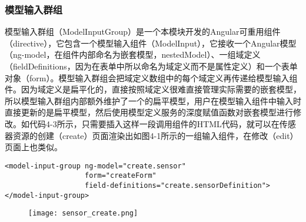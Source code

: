 \subsubsection{模型输入群组}
模型输入群组（ModelInputGroup）是一个本模块开发的Angular可重用组件（directive），它包含一个模型输入组件（ModelInput），它接收一个Angular模型（ng-model，在组件内部命名为嵌套模型，nestedModel）、一组域定义（fieldDefinitions，因为在表单中所以命名为域定义而不是属性定义）和一个表单对象（form）。模型输入群组会把域定义数组中的每个域定义再传递给模型输入组件。因为域定义是扁平化的，直接按照域定义很难直接管理实际需要的嵌套模型，所以模型输入群组内部额外维护了一个的扁平模型，用户在模型输入组件中输入时直接更新的是扁平模型，然后使用模型定义服务的深度赋值函数对嵌套模型进行修改。如代码4-3所示，只需要插入这样一段调用组件的HTML代码，就可以在传感器资源的创建（create）页面渲染出如图4-1所示的一组输入组件，在修改（edit）页面上也类似。
\begin{lstlisting}[language={HTML5}, caption={传感器创建页面中的模型输入群组代码}]
<model-input-group ng-model="create.sensor"
                   form="createForm"
                   field-definitions="create.sensorDefinition">
</model-input-group>
\end{lstlisting}
\begin{figure}[H]
 \centering
 \texttt{[image: sensor\_create.png]}
\end{figure}
